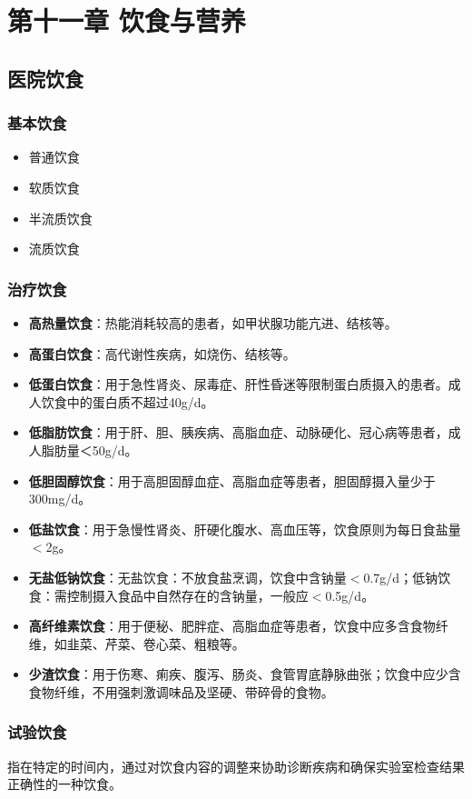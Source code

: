 \documentclass[11pt, a4paper]{ctexart}
\begin{document}
\section{第十一章 饮食与营养}
\subsection{医院饮食}
\subsubsection{基本饮食}
\begin{itemize}
	\item 普通饮食
	\item 软质饮食
	\item 半流质饮食
	\item 流质饮食
\end{itemize}

\subsubsection{治疗饮食}
\begin{itemize}
	\item \textbf{高热量饮食}：热能消耗较高的患者，如甲状腺功能亢进、结核等。
	\item \textbf{高蛋白饮食}：高代谢性疾病，如烧伤、结核等。
	\item \textbf{低蛋白饮食}：用于急性肾炎、尿毒症、肝性昏迷等限制蛋白质摄入的患者。成人饮食中的蛋白质不超过40g/d。
	\item \textbf{低脂肪饮食}：用于肝、胆、胰疾病、高脂血症、动脉硬化、冠心病等患者，成人脂肪量＜50g/d。
	\item \textbf{低胆固醇饮食}：用于高胆固醇血症、高脂血症等患者，胆固醇摄入量少于300mg/d。
	\item \textbf{低盐饮食}：用于急慢性肾炎、肝硬化腹水、高血压等，饮食原则为每日食盐量$<$2g。
	\item \textbf{无盐低钠饮食}：无盐饮食：不放食盐烹调，饮食中含钠量$<$0.7g/d；低钠饮食：需控制摄入食品中自然存在的含钠量，一般应$<$0.5g/d。
	\item \textbf{高纤维素饮食}：用于便秘、肥胖症、高脂血症等患者，饮食中应多含食物纤维，如韭菜、芹菜、卷心菜、粗粮等。
	\item \textbf{少渣饮食}：用于伤寒、痢疾、腹泻、肠炎、食管胃底静脉曲张；饮食中应少含食物纤维，不用强刺激调味品及坚硬、带碎骨的食物。
\end{itemize}

\subsubsection{试验饮食}
指在特定的时间内，通过对饮食内容的调整来协助诊断疾病和确保实验室检查结果正确性的一种饮食。
\end{document}
